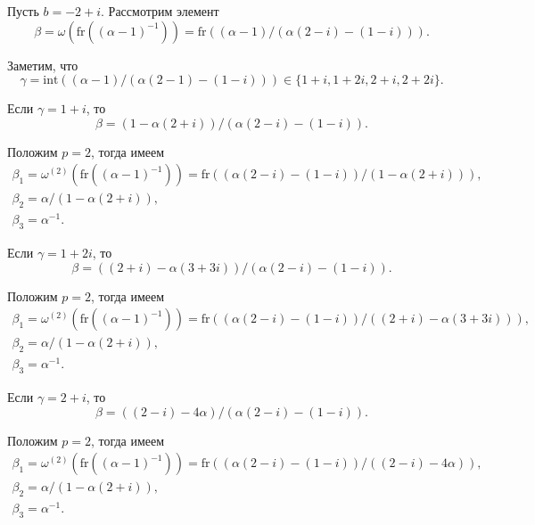 \documentclass[_00_dissertation.tex]{subfiles}
\begin{document}
\begin{example}
    Пусть $b=-2+i$. Рассмотрим элемент
    \begin{equation*}
        \beta=\omega(\textrm{fr}((\alpha-1)^{-1}))=\textrm{fr}((\alpha-1)/(\alpha(2-i)-(1-i))).
    \end{equation*}

    Заметим, что
    \begin{equation*}
        \gamma=\textrm{int}((\alpha-1)/(\alpha(2-1)-(1-i)))\in\{1+i,1+2i,2+i,2+2i\}.
    \end{equation*}

    Если $\gamma=1+i$, то
    \begin{equation*}
        \beta=(1-\alpha(2+i))/(\alpha(2-i)-(1-i)).
    \end{equation*}

    Положим $p=2$, тогда имеем
    \begin{equation*}
        \begin{array}{c}
            \beta_1=\omega^{(2)}(\textrm{fr}((\alpha-1)^{-1}))=\textrm{fr}((\alpha(2-i)-(1-i))/(1-\alpha(2+i))),\\
            \beta_2=\alpha/(1-\alpha(2+i)),\\
            \beta_3=\alpha^{-1}.
        \end{array}
    \end{equation*}

    Если $\gamma=1+2i$, то
    \begin{equation*}
        \beta=((2+i)-\alpha(3+3i))/(\alpha(2-i)-(1-i)).
    \end{equation*}

    Положим $p=2$, тогда имеем
    \begin{equation*}
        \begin{array}{c}
            \beta_1=\omega^{(2)}(\textrm{fr}((\alpha-1)^{-1}))=\textrm{fr}((\alpha(2-i)-(1-i))/((2+i)-\alpha(3+3i))),\\
            \beta_2=\alpha/(1-\alpha(2+i)),\\
            \beta_3=\alpha^{-1}.
        \end{array}
    \end{equation*}

    Если $\gamma=2+i$, то
    \begin{equation*}
        \beta=((2-i)-4\alpha)/(\alpha(2-i)-(1-i)).
    \end{equation*}

    Положим $p=2$, тогда имеем
    \begin{equation*}
        \begin{array}{c}
            \beta_1=\omega^{(2)}(\textrm{fr}((\alpha-1)^{-1}))=\textrm{fr}((\alpha(2-i)-(1-i))/((2-i)-4\alpha)),\\
            \beta_2=\alpha/(1-\alpha(2+i)),\\
            \beta_3=\alpha^{-1}.
        \end{array}
    \end{equation*}


\end{example}
\end{document}
